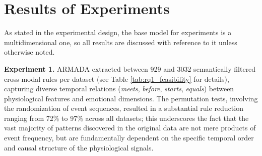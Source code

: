\documentclass{isd}
\begin{document}
{%

\section{Results of Experiments}

\label{sec:experimentsResults}
As stated in the experimental design, the base model for experiments is a multidimensional one, so all results are discussed with reference to it unless otherwise noted.

\textbf{Experiment 1.} ARMADA extracted between 929 and 3032 semantically filtered cross-modal rules per dataset (see Table \ref{tab:rq1_feasibility} for details), capturing diverse temporal relations (\textit{meets}, \textit{before}, \textit{starts}, \textit{equals}) between physiological features and emotional dimensions. The permutation tests, involving the randomization of event sequences, resulted in a substantial rule reduction ranging from 72\% to 97\% across all datasets; this underscores the fact that the vast majority of patterns discovered in the original data are not mere products of event frequency, but are fundamentally dependent on the specific temporal order and causal structure of the physiological signals.

}
\end{document}
